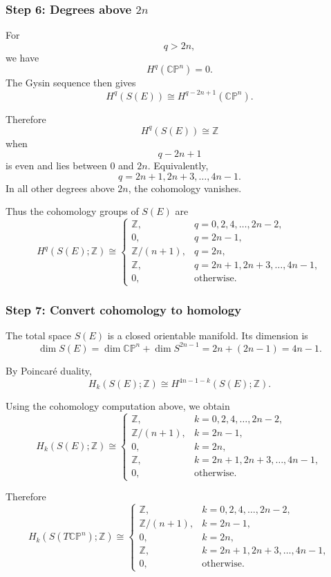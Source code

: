\documentclass[12pt,a4paper]{article}
\theoremstyle{notespace}
\begin{document}
\subsubsection*{Step 6: Degrees above \(2n\)}

For
\[
q>2n,
\]
we have
\[
H^q(\mathbb{CP}^n)=0.
\]
The Gysin sequence then gives
\[
H^q(S(E))\cong H^{q-2n+1}(\mathbb{CP}^n).
\]

Therefore
\[
H^q(S(E))\cong \mathbb Z
\]
when
\[
q-2n+1
\]
is even and lies between \(0\) and \(2n\). Equivalently,
\[
q=2n+1,2n+3,\ldots,4n-1.
\]
In all other degrees above \(2n\), the cohomology vanishes.

Thus the cohomology groups of \(S(E)\) are
\[
H^q(S(E);\mathbb Z)\cong
\begin{cases}
	\mathbb Z, & q=0,2,4,\ldots,2n-2,\\[1mm]
	0, & q=2n-1,\\[1mm]
	\mathbb Z/(n+1), & q=2n,\\[1mm]
	\mathbb Z, & q=2n+1,2n+3,\ldots,4n-1,\\[1mm]
	0, & \text{otherwise}.
\end{cases}
\]

\subsubsection*{Step 7: Convert cohomology to homology}

The total space \(S(E)\) is a closed orientable manifold. Its dimension is
\[
\dim S(E)
=
\dim \mathbb{CP}^n+\dim S^{2n-1}
=
2n+(2n-1)
=
4n-1.
\]

By Poincar\'e duality,
\[
H_k(S(E);\mathbb Z)
\cong
H^{4n-1-k}(S(E);\mathbb Z).
\]

Using the cohomology computation above, we obtain
\[
H_k(S(E);\mathbb Z)\cong
\begin{cases}
	\mathbb Z, & k=0,2,4,\ldots,2n-2,\\[1mm]
	\mathbb Z/(n+1), & k=2n-1,\\[1mm]
	0, & k=2n,\\[1mm]
	\mathbb Z, & k=2n+1,2n+3,\ldots,4n-1,\\[1mm]
	0, & \text{otherwise}.
\end{cases}
\]

Therefore
\[
\boxed{
	H_k(S(T\mathbb{CP}^n);\mathbb Z)\cong
	\begin{cases}
		\mathbb Z, & k=0,2,4,\ldots,2n-2,\\[1mm]
		\mathbb Z/(n+1), & k=2n-1,\\[1mm]
		0, & k=2n,\\[1mm]
		\mathbb Z, & k=2n+1,2n+3,\ldots,4n-1,\\[1mm]
		0, & \text{otherwise}.
	\end{cases}
}
\]
\end{document}
